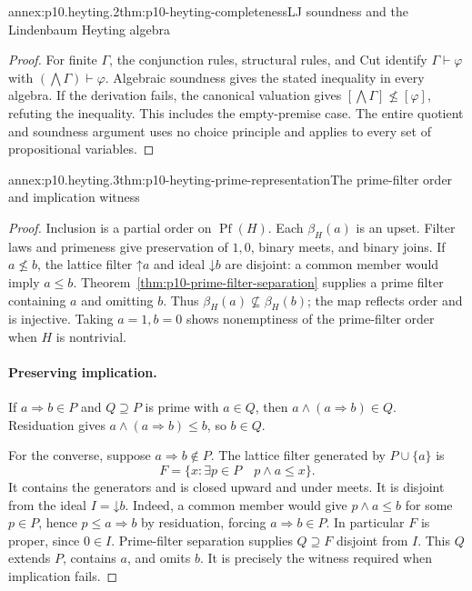 \begin{annexitem}{annex:p10.heyting.2}{thm:p10-heyting-completeness}{LJ soundness and the Lindenbaum Heyting algebra}
\begin{proof}
For finite \(\Gamma\), the conjunction rules, structural rules,
and Cut identify
\(\Gamma\vdash\varphi\) with
\((\bigwedge\Gamma)\vdash\varphi\).
Algebraic soundness gives the stated inequality in every algebra.
If the derivation fails, the canonical valuation gives
\([\bigwedge\Gamma]\not\leq[\varphi]\), refuting the inequality.
This includes the empty-premise case.
The entire quotient and soundness argument uses no choice principle
and applies to every set of propositional variables.
\end{proof}
\end{annexitem}

\begin{annexitem}{annex:p10.heyting.3}{thm:p10-heyting-prime-representation}{The prime-filter order and implication witness}
\begin{proof}
Inclusion is a partial order on \(\operatorname{Pf}(H)\).
Each \(\beta_H(a)\) is an upset.
Filter laws and primeness give preservation of \(1,0\),
binary meets, and binary joins.
If \(a\not\leq b\), the lattice filter
\(\mathord{\uparrow}a\) and ideal \(\mathord{\downarrow}b\)
are disjoint: a common member would imply \(a\leq b\).
Theorem~\ref{thm:p10-prime-filter-separation} supplies a
prime filter containing \(a\) and omitting \(b\).
Thus \(\beta_H(a)\not\subseteq\beta_H(b)\);
the map reflects order and is injective.
Taking \(a=1,b=0\) shows nonemptiness of the prime-filter
order when \(H\) is nontrivial.

\paragraph{Preserving implication.}
If \(a\Rightarrow b\in P\) and \(Q\supseteq P\) is prime
with \(a\in Q\), then
\(a\wedge(a\Rightarrow b)\in Q\).
Residuation gives \(a\wedge(a\Rightarrow b)\leq b\),
so \(b\in Q\).

For the converse, suppose \(a\Rightarrow b\notin P\).
The lattice filter generated by \(P\cup\{a\}\) is
\[
 F=\{x:\exists p\in P\quad p\wedge a\leq x\}.
\]
It contains the generators and is closed upward and under meets.
It is disjoint from the ideal \(I=\mathord{\downarrow}b\).
Indeed, a common member would give \(p\wedge a\leq b\)
for some \(p\in P\), hence \(p\leq a\Rightarrow b\)
by residuation, forcing \(a\Rightarrow b\in P\).
In particular \(F\) is proper, since \(0\in I\).
Prime-filter separation supplies \(Q\supseteq F\) disjoint
from \(I\).
This \(Q\) extends \(P\), contains \(a\), and omits \(b\).
It is precisely the witness required when implication fails.


\end{proof}
\end{annexitem}
